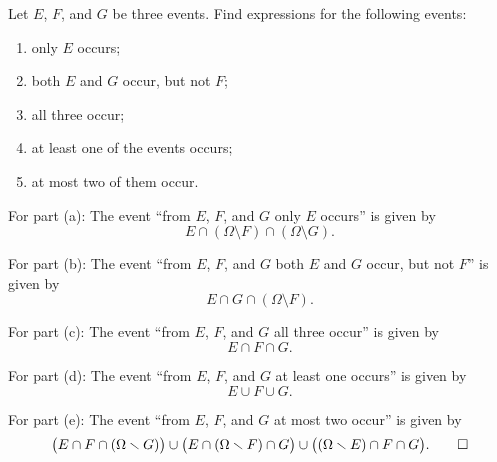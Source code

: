 \begin{problem}[Handout 1, \# 11]
  Let \(E\), \(F\), and \(G\) be three events. Find expressions for the
  following events:
  \begin{enumerate}[label=(\alph*),noitemsep]
  \item only \(E\) occurs;
  \item both \(E\) and \(G\) occur, but not \(F\);
  \item all three occur;
  \item at least one of the events occurs;
  \item at most two of them occur.
  \end{enumerate}
\end{problem}
\begin{solution*}
  For part (a): The event ``from \(E\), \(F\), and \(G\) only \(E\)
  occurs'' is given by
  \[
    E\cap(\Omega\setminus F)\cap(\Omega\setminus G).
  \]

  For part (b): The event ``from \(E\), \(F\), and \(G\) both \(E\) and
  \(G\) occur, but not \(F\)'' is given by
  \[
    E\cap G\cap(\Omega\setminus F).
  \]

  For part (c): The event ``from \(E\), \(F\), and \(G\) all three occur''
  is given by
  \[
    E\cap F\cap G.
  \]

  For part (d): The event ``from \(E\), \(F\), and \(G\) at least one
  occurs'' is given by
  \[
    E\cup F\cup G.
  \]

  For part (e): The event ``from \(E\), \(F\), and \(G\) at most two
  occur'' is given by
  \[
    \bigl(E\cap F\cap(\Omega\setminus G)\bigr)\cup%
    \bigl(E\cap (\Omega\setminus F)\cap G\bigr)\cup%
    \bigl((\Omega\setminus E)\cap F\cap G\bigr).\qedhere
  \]
\end{solution*}

